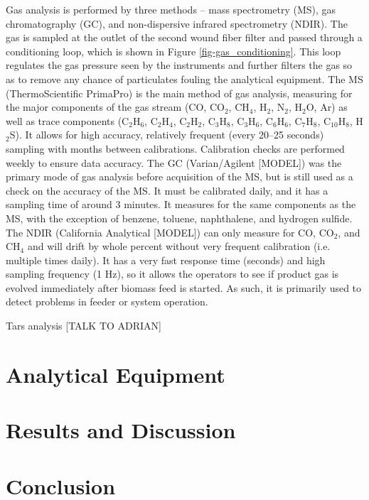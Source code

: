 \documentclass[11pt,twocolumn]{article}
\begin{document}
Gas analysis is performed by three methods -- mass spectrometry (MS), gas chromatography (GC), and non-dispersive infrared spectrometry (NDIR).  The gas is sampled at the outlet of the second wound fiber filter and passed through a conditioning loop, which is shown in Figure \ref{fig-gas_conditioning}.  This loop regulates the gas pressure seen by the instruments and further filters the gas so as to remove any chance of particulates fouling the analytical equipment.  The MS (ThermoScientific PrimaPro) is the main method of gas analysis, measuring for the major components of the gas stream (CO, CO$_2$, CH$_4$, H$_2$, N$_2$, H$_2$O, Ar) as well as trace components (C$_2$H$_6$, C$_2$H$_4$, C$_2$H$_2$, C$_3$H$_8$, C$_3$H$_6$, C$_6$H$_6$, C$_7$H$_8$, C$_10$H$_8$, H$_2$S).  It allows for high accuracy, relatively frequent (every 20--25 seconds) sampling with months between calibrations.  Calibration checks are performed weekly to ensure data accuracy.  The GC (Varian/Agilent [MODEL]) was the primary mode of gas analysis before acquisition of the MS, but is still used as a check on the accuracy of the MS.  It must be calibrated daily, and it has a sampling time of around 3 minutes.  It measures for the same components as the MS, with the exception of benzene, toluene, naphthalene, and hydrogen sulfide.  The NDIR (California Analytical [MODEL]) can only measure for CO, CO$_2$, and CH$_4$ and will drift by whole percent without very frequent calibration (i.e. multiple times daily).  It has a very fast response time (seconds) and high sampling frequency (1 Hz), so it allows the operators to see if product gas is evolved immediately after biomass feed is started.  As such, it is primarily used to detect problems in feeder or system operation.

Tars analysis [TALK TO ADRIAN]


\section*{Analytical Equipment}

 


\section*{Results and Discussion}



\section*{Conclusion}



\newpage
\appendix
\onecolumn
\end{document}
